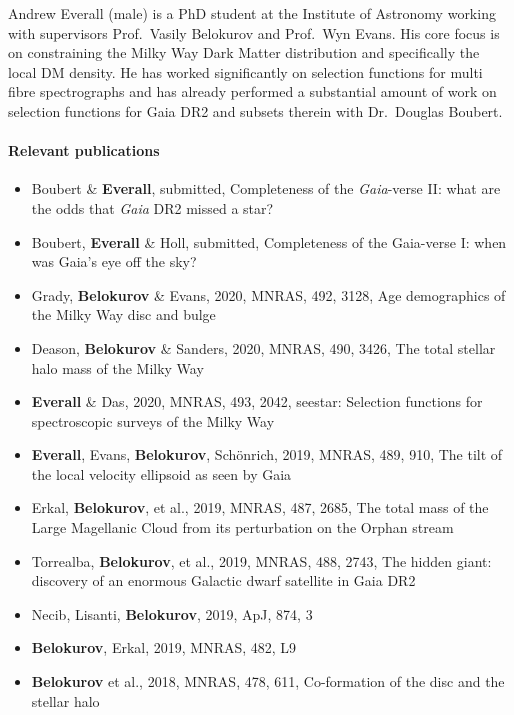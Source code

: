 Andrew Everall (male) is a PhD student at the Institute of Astronomy working with supervisors Prof.~Vasily Belokurov and Prof.~Wyn Evans. His core focus is on constraining the Milky Way Dark Matter distribution and specifically the local DM density. He has worked significantly on selection functions for multi fibre spectrographs and has already performed a substantial amount of work on selection functions for Gaia DR2 and subsets therein with Dr.~Douglas Boubert. 

\paragraph{Relevant publications}

\begin{itemize}
    \item Boubert \& \textbf{Everall}, submitted, Completeness of the \textit{Gaia}-verse II: what are the odds that \textit{Gaia} DR2 missed a star?
    \item Boubert, \textbf{Everall} \& Holl, submitted, Completeness of the Gaia-verse I: when was Gaia’s eye off the sky?
    \item Grady, \textbf{Belokurov} \& Evans, 2020, MNRAS, 492, 3128, Age demographics of the Milky Way disc and bulge
    \item Deason, \textbf{Belokurov} \& Sanders, 2020, MNRAS, 490, 3426, The total stellar halo mass of the Milky Way
    \item \textbf{Everall} \& Das, 2020, MNRAS, 493, 2042, seestar: Selection functions for spectroscopic surveys of the Milky Way
    \item \textbf{Everall}, Evans, \textbf{Belokurov}, Schönrich, 2019, MNRAS, 489, 910, The tilt of the local velocity ellipsoid as seen by Gaia
    \item Erkal, \textbf{Belokurov}, et al., 2019, MNRAS, 487, 2685, The total mass of the Large Magellanic Cloud from its perturbation on the Orphan stream
    \item Torrealba, \textbf{Belokurov}, et al., 2019, MNRAS, 488, 2743, The hidden giant: discovery of an enormous Galactic dwarf satellite in Gaia DR2
    \item Necib, Lisanti, \textbf{Belokurov}, 2019, ApJ, 874, 3
    \item \textbf{Belokurov}, Erkal, 2019, MNRAS, 482, L9
    \item \textbf{Belokurov} et al., 2018, MNRAS, 478, 611, Co-formation of the disc and the stellar halo
\end{itemize}

